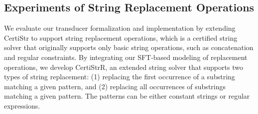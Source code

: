 


\subsection{Experiments of String Replacement Operations}

We evaluate our transducer formalization and implementation by extending CertiStr \cite{cpp/KanLRS22} to support string replacement operations, which is a certified string solver that originally supports only basic string operations, such as concatenation and regular constraints. By integrating our SFT-based modeling of replacement operations, we develop CertiStrR, an extended string solver that supports two types of string replacement: (1) replacing the first occurrence of a substring matching a given pattern, and (2) replacing all occurrences of substrings matching a given pattern. The patterns can be either constant strings or regular expressions.






%
%

